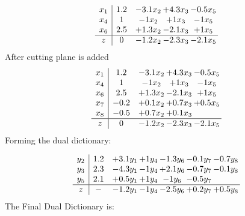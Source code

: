 \documentclass[11pt]{article}
\begin{document}
\[\begin{array}{c| c c@{\hskip 2pt} c@{\hskip 2pt} c@{\hskip 2pt} }
 x_{1}   &  1.2 & -3.1 x_{2} & + 4.3 x_{3} & -0.5 x_{5}\\
 x_{4}   &  1 & -1 x_{2} & + 1 x_{3} & -1 x_{5}\\
 x_{6}   &  2.5 & + 1.3 x_{2} & -2.1 x_{3} & + 1 x_{5}\\
\hline
z    &  0 & -1.2 x_{2} & -2.3 x_{3} & -2.1 x_{5}\\
\end{array}\]
 After cutting plane is added 
\[\begin{array}{c| c c@{\hskip 2pt} c@{\hskip 2pt} c@{\hskip 2pt} }
 x_{1}   &  1.2 & -3.1 x_{2} & + 4.3 x_{3} & -0.5 x_{5}\\
 x_{4}   &  1 & -1 x_{2} & + 1 x_{3} & -1 x_{5}\\
 x_{6}   &  2.5 & + 1.3 x_{2} & -2.1 x_{3} & + 1 x_{5}\\
 x_{7}   &  -0.2 & + 0.1 x_{2} & + 0.7 x_{3} & + 0.5 x_{5}\\
 x_{8}   &  -0.5 & + 0.7 x_{2} & + 0.1 x_{3} &   \\
\hline
z    &  0 & -1.2 x_{2} & -2.3 x_{3} & -2.1 x_{5}\\
\end{array}\]
Forming the dual dictionary:

\[\begin{array}{c| c c@{\hskip 2pt} c@{\hskip 2pt} c@{\hskip 2pt} c@{\hskip 2pt} c@{\hskip 2pt} }
 y_{2}   &  1.2 & + 3.1 y_{1} & + 1 y_{4} & -1.3 y_{6} & -0.1 y_{7} & -0.7 y_{8}\\
 y_{3}   &  2.3 & -4.3 y_{1} & -1 y_{4} & + 2.1 y_{6} & -0.7 y_{7} & -0.1 y_{8}\\
 y_{5}   &  2.1 & + 0.5 y_{1} & + 1 y_{4} & -1 y_{6} & -0.5 y_{7} &   \\
\hline
z    &  - & -1.2 y_{1} & -1 y_{4} & -2.5 y_{6} & + 0.2 y_{7} & + 0.5 y_{8}\\
\end{array}\]
The Final Dual Dictionary is: 
\end{document}
